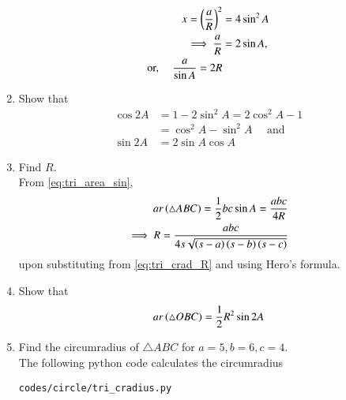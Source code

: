 \begin{enumerate}[label=\arabic*.,ref=\thesubsection.\theenumi]
\begin{align}
x = \left(\frac{a}{R}\right)^2 &= 4 \sin^2 A 
\\
\implies \frac{a}{R} &= 2\sin A,
\\
\text{or, }\quad \frac{a}{\sin A} = 2R
\end{align}
%
\item Show that 
\label{eq:cos2x}
\begin{align}
\cos 2A &= 1 -2\sin^2 A = 2\cos^2 A - 1 
\\
&= \cos^2 A - \sin^2A \quad \text{ and }
\\
\sin 2A &= 2 \sin A \cos A
\label{eq:sin2x}
\end{align}
\item Find $R$.
\\
\solution From \eqref{eq:tri_area_sin}, 
\begin{align}
ar\left(\triangle ABC\right) = \frac{1}{2}bc \sin A = \frac{abc}{4R}&
\\
\implies R = \frac{abc}{4s\sqrt{\left(s-a\right)\left(s-b\right)\left(s-c\right)}}&
\end{align}
%
upon substituting from \eqref{eq:tri_crad_R} and using Hero's formula.
%
\item Show that
%
\begin{align}
\label{eq:circ_area_chord}
ar\left(\triangle OBC\right) = \frac{1}{2}R^2\sin 2A
\end{align}
%
\item Find the circumradius of $\triangle ABC$ for $a = 5, b = 6, c = 4$.
%
\\
\solution The following python code calculates the circumradius
\begin{lstlisting}
codes/circle/tri_cradius.py
\end{lstlisting}


\end{enumerate}
